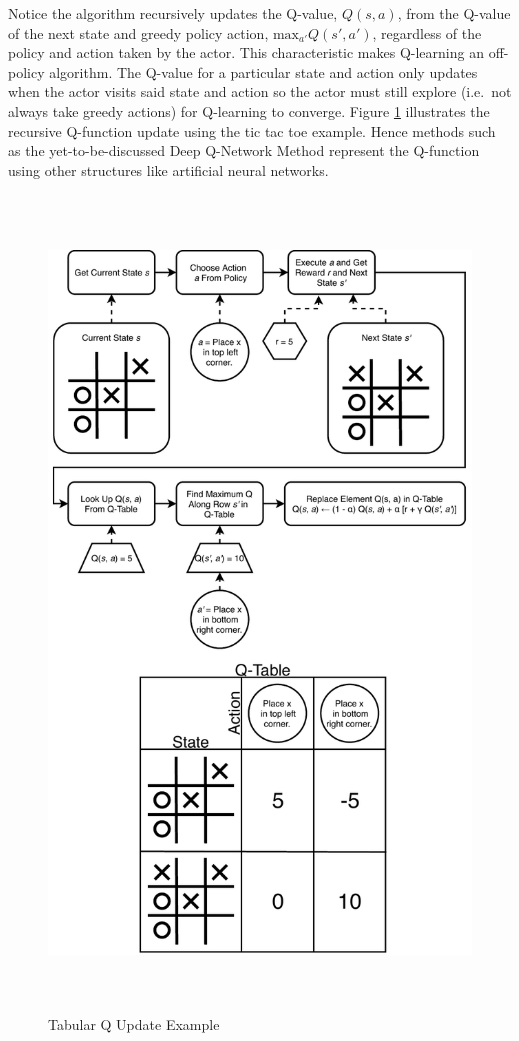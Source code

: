 Notice the algorithm recursively updates the Q-value, $Q(s,a)$, from the Q-value of the next state and greedy policy action, $\text{max}_{a'}Q(s',a')$, regardless of the policy and action taken by the actor. This characteristic makes Q-learning an off-policy algorithm. The Q-value for a particular state and action only updates when the actor visits said state and action so the actor must still explore (i.e.\ not always take greedy actions) for Q-learning to converge. Figure \ref{fig:q_learning_ex} illustrates the recursive Q-function update using the tic tac toe example. Hence methods such as the yet-to-be-discussed Deep Q-Network Method represent the Q-function using other structures like artificial neural networks.
\begin{figure}   %
	\centering \includegraphics[width=6in, height=8.5in, keepaspectratio]{figures/q_learning_ex.pdf}
	\caption{Tabular Q Update Example}\label{fig:q_learning_ex}
\end{figure}

